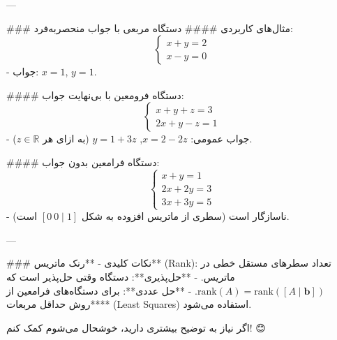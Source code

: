 ---

### مثال‌های کاربردی
#### دستگاه مربعی با جواب منحصربه‌فرد:
\[
\begin{cases}
	x + y = 2 \\
	x - y = 0
\end{cases}
\]
- جواب: \( x = 1 \), \( y = 1 \).

#### دستگاه فرومعین با بی‌نهایت جواب:
\[
\begin{cases}
	x + y + z = 3 \\
	2x + y - z = 1
\end{cases}
\]
- جواب عمومی: \( x = 2 - 2z \), \( y = 1 + 3z \) (به ازای هر \( z \in \mathbb{R} \)).

#### دستگاه فرامعین بدون جواب:
\[
\begin{cases}
	x + y = 1 \\
	2x + 2y = 3 \\
	3x + 3y = 5
\end{cases}
\]
- ناسازگار است (سطری از ماتریس افزوده به شکل \( [0 \ 0 \mid 1] \) است).

---

### نکات کلیدی
- **رنک ماتریس** (Rank): تعداد سطرهای مستقل خطی در ماتریس.
- **حل‌پذیری**: دستگاه وقتی حل‌پذیر است که \( \text{rank}(A) = \text{rank}([A \mid \mathbf{b}]) \).
- **حل عددی**: برای دستگاه‌های فرامعین از **روش حداقل مربعات** (Least Squares) استفاده می‌شود.

اگر نیاز به توضیح بیشتری دارید، خوشحال می‌شوم کمک کنم! 😊	